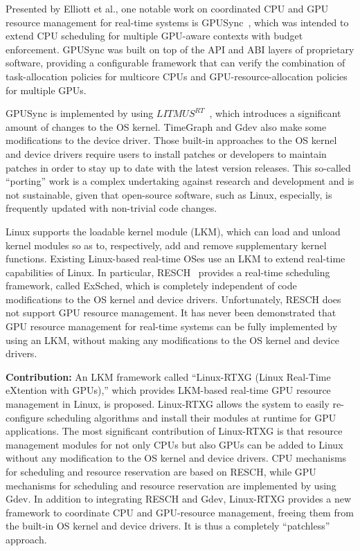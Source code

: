 Presented by Elliott et al., one notable work on coordinated CPU and GPU resource management for real-time systems is GPUSync~\cite{elliott:gpusync13,elliott:explor14}, which was intended to extend CPU scheduling for multiple GPU-aware contexts with budget enforcement. GPUSync was built on top of the API and ABI layers of proprietary software, providing a configurable framework that can verify the combination of task-allocation policies for multicore CPUs and GPU-resource-allocation policies for multiple GPUs.

GPUSync is implemented by using $LITMUS^{RT}$~\cite{litmus}, which introduces a significant amount of changes to the OS kernel. TimeGraph and Gdev also make some modifications to the device driver. Those built-in approaches to the OS kernel and device drivers require users to install patches or developers to maintain patches in order to stay up to date with the latest version releases. This so-called ``porting'' work is a complex undertaking against research and development and is not sustainable, given that open-source software, such as Linux, especially, is frequently updated with non-trivial code changes.

Linux supports the loadable kernel module (LKM), which can load and unload kernel modules so as to, respectively, add and remove supplementary kernel functions. Existing Linux-based real-time OSes use an LKM to extend real-time capabilities of Linux. In particular, RESCH~\cite{kato2009loadable, asberg2012exsched} provides a real-time scheduling framework, called ExSched, which is completely independent of code modifications to the OS kernel and device drivers. Unfortunately, RESCH does not support GPU resource management. It has never been demonstrated that GPU resource management for real-time systems can be fully implemented by using an LKM, without making any modifications to the OS kernel and device drivers.

\textbf{Contribution:} An LKM framework called ``Linux-RTXG (Linux Real-Time eXtention with GPUs),'' which provides LKM-based real-time GPU resource management in Linux, is proposed. Linux-RTXG allows the system to easily re-configure scheduling algorithms and install their modules at runtime for GPU applications. The most significant contribution of Linux-RTXG is that resource management modules for not only CPUs but also GPUs can be added to Linux without any modification to the OS kernel and device drivers. CPU mechanisms for scheduling and resource reservation are based on RESCH, while GPU mechanisms for scheduling and resource reservation are implemented by using Gdev. In addition to integrating RESCH and Gdev, Linux-RTXG provides a new framework to coordinate CPU and GPU-resource management, freeing them from the built-in OS kernel and device drivers. It is thus a completely ``patchless'' approach.

